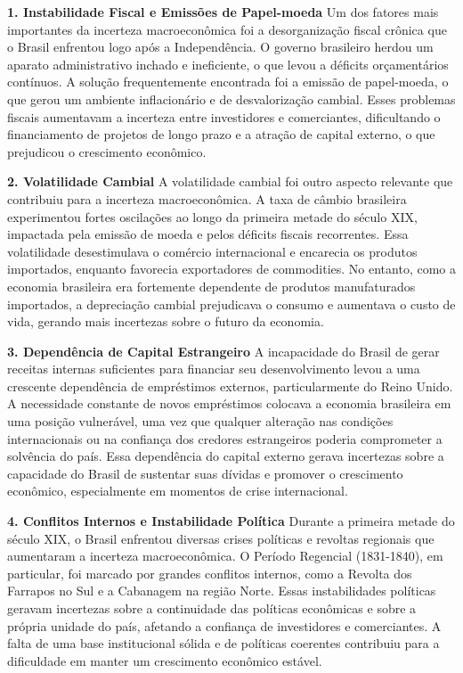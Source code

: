 \documentclass[a4paper,12pt]{article}[abntex2]
\begin{document}
\textbf{1. Instabilidade Fiscal e Emissões de Papel-moeda}
Um dos fatores mais importantes da incerteza macroeconômica foi a desorganização fiscal crônica que o Brasil enfrentou logo após a Independência. O governo brasileiro herdou um aparato administrativo inchado e ineficiente, o que levou a déficits orçamentários contínuos. A solução frequentemente encontrada foi a emissão de papel-moeda, o que gerou um ambiente inflacionário e de desvalorização cambial. Esses problemas fiscais aumentavam a incerteza entre investidores e comerciantes, dificultando o financiamento de projetos de longo prazo e a atração de capital externo, o que prejudicou o crescimento econômico.

\textbf{2. Volatilidade Cambial}
A volatilidade cambial foi outro aspecto relevante que contribuiu para a incerteza macroeconômica. A taxa de câmbio brasileira experimentou fortes oscilações ao longo da primeira metade do século XIX, impactada pela emissão de moeda e pelos déficits fiscais recorrentes. Essa volatilidade desestimulava o comércio internacional e encarecia os produtos importados, enquanto favorecia exportadores de commodities. No entanto, como a economia brasileira era fortemente dependente de produtos manufaturados importados, a depreciação cambial prejudicava o consumo e aumentava o custo de vida, gerando mais incertezas sobre o futuro da economia.

\textbf{3. Dependência de Capital Estrangeiro}
A incapacidade do Brasil de gerar receitas internas suficientes para financiar seu desenvolvimento levou a uma crescente dependência de empréstimos externos, particularmente do Reino Unido. A necessidade constante de novos empréstimos colocava a economia brasileira em uma posição vulnerável, uma vez que qualquer alteração nas condições internacionais ou na confiança dos credores estrangeiros poderia comprometer a solvência do país. Essa dependência do capital externo gerava incertezas sobre a capacidade do Brasil de sustentar suas dívidas e promover o crescimento econômico, especialmente em momentos de crise internacional.

\textbf{4. Conflitos Internos e Instabilidade Política}
Durante a primeira metade do século XIX, o Brasil enfrentou diversas crises políticas e revoltas regionais que aumentaram a incerteza macroeconômica. O Período Regencial (1831-1840), em particular, foi marcado por grandes conflitos internos, como a Revolta dos Farrapos no Sul e a Cabanagem na região Norte. Essas instabilidades políticas geravam incertezas sobre a continuidade das políticas econômicas e sobre a própria unidade do país, afetando a confiança de investidores e comerciantes. A falta de uma base institucional sólida e de políticas coerentes contribuiu para a dificuldade em manter um crescimento econômico estável.
\end{document}

